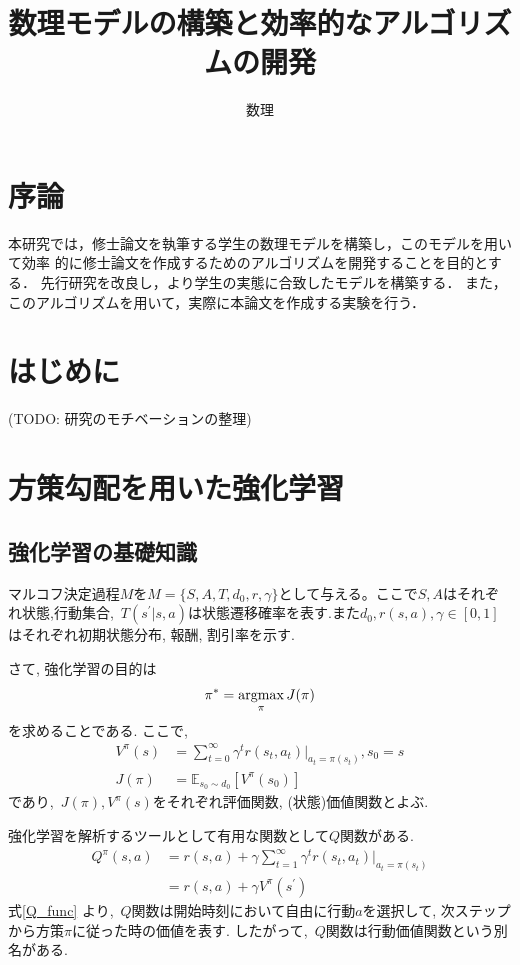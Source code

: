\documentclass[dvipdfmx]{ampmt}
\title{数理モデルの構築と効率的なアルゴリズムの開発} %
      {}                                             %
      {}                                             %
\author{数理}{三郎}             %
\newcommand{\argmax}{\mathop{\rm argmax}\limits}
\newcommand{\expect}{\mathbb{E}}
\begin{document}
\ifoutputbody
\makeinsidecover                %
\makeabstract                   %
\maketoc                        %
\setcounter{page}{1}            %
\section{序論}
本研究では，修士論文を執筆する学生の数理モデルを構築し，このモデルを用いて効率
的に修士論文を作成するためのアルゴリズムを開発することを目的とする．
先行研究\cite{suuri2010}を改良し，より学生の実態に合致したモデルを構築する．
また，このアルゴリズムを用いて，実際に本論文を作成する実験を行う．

\section{はじめに}
(TODO: 研究のモチベーションの整理)

\section{方策勾配を用いた強化学習}
\subsection{強化学習の基礎知識}
マルコフ決定過程$M$を$M=\{S,A,T,d_0,r,\gamma\}$として与える。ここで$S,A$はそれぞれ状態,行動集合,~$T(s^{'}|s,a)$は状態遷移確率を表す.また$d_0,r(s,a),\gamma\in[0,1]$はそれぞれ初期状態分布, 報酬, 割引率を示す.\par
さて, 強化学習の目的は
\begin{equation}
	\pi^{*}=\argmax_{\pi}J(\pi) \label{purpose_of_rl}
\end{equation}を求めることである. ここで, 
\begin{align}
	V^{\pi}(s) &= \sum_{t=0}^{\infty}\gamma^tr(s_t, a_t)|_{a_t=\pi(s_t)}, s_0 = s\\
	J(\pi) &= \expect_{s_0\sim d_0}[V^{\pi}(s_0)]
\end{align}
であり,~$J(\pi), V^{\pi}(s)$をそれぞれ評価関数, (状態)価値関数とよぶ.\par
強化学習を解析するツールとして有用な関数として$Q$関数がある.
\begin{align}
	Q^{\pi}(s,a) &= r(s, a) + \gamma\sum_{t=1}^{\infty}\gamma^tr(s_t, a_t)|_{a_t=\pi(s_t)} \nonumber\\
			    &= r(s, a) + \gamma V^{\pi}(s^{\prime}) \label{Q_func}
\end{align}
式\eqref{Q_func} より,~$Q$関数は開始時刻において自由に行動$a$を選択して, 次ステップから方策$\pi$に従った時の価値を表す. したがって,~$Q$関数は行動価値関数という別名がある.
\end{document}
